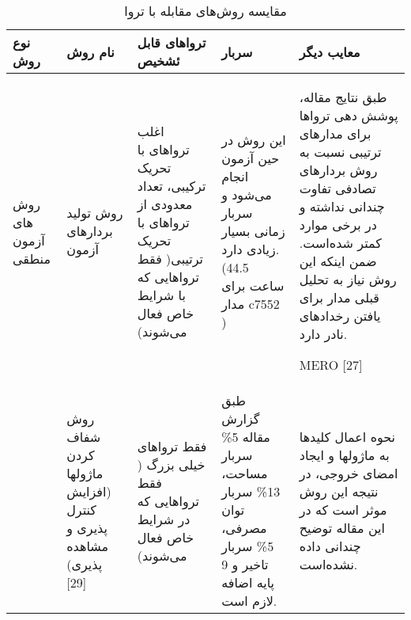 
\begin{table}
	\caption{مقایسه روش‌های مقابله با تروا}
	\label{tcomparison}
	\begin{tabular}{|p{1cm}||p{3cm}|p{3cm}|p{3cm}|p{3cm}|}
		\hline

		نوع روش & نام روش  & تروا‌های قابل ئشخیص & سربار& معایب دیگر \\ \hline \hline
		روش ‌های آزمون منطقی& روش تولید بردارهای آزمون&اغلب تروا‌های با تحریک ترکیبی، تعداد معدودی از تروا‌های با تحریک ترتیبی(  فقط تروا‌هایی که با شرایط خاص فعال می‌شوند)&این روش در حین آزمون انجام می‌شود و سربار زمانی بسیار زیادی دارد.(44.5 ساعت برای مدار c7552 )&طبق نتایج مقاله، پوشش دهی تروا‌ها برای مدارهای ترتیبی نسبت به روش بردارهای تصادفی تفاوت چندانی نداشته و در برخی موارد کمتر شده‌است. ضمن اینکه  این روش نیاز به تحلیل قبلی مدار برای یافتن رخدادهای نادر دارد.
		
		MERO [27]
		
		\\ \cline{2-5}
		&روش شفاف کردن ماژول­ها (افزایش کنترل پذیری و مشاهده پذیری) [29]  &فقط تروا‌های خیلی بزرگ ( فقط تروا‌هایی که در شرایط خاص فعال می‌شوند)&طبق گزارش مقاله 5\% سربار مساحت، 13\% سربار توان مصرفی، 5\% سربار تاخیر و 9 پایه اضافه لازم است. & نحوه اعمال کلیدها به ماژول­ها و ایجاد امضای خروجی، در نتیجه این روش موثر است که در این مقاله توضیح چندانی داده نشده‌است.
		\\ \hline \hline 
	\end{tabular}
\end{table}
\newpage

